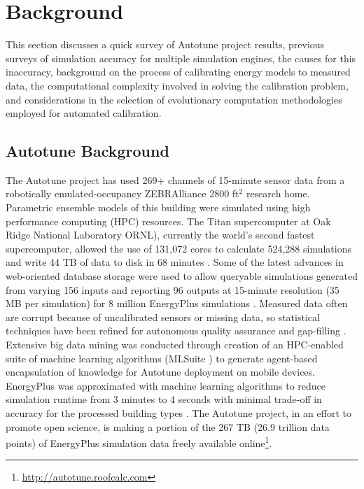 \documentclass[preprint, review, 12pt]{elsarticle}
\begin{document}
\section{Background}
\label{sec:background}
This section discusses a quick survey of Autotune project results, previous surveys of simulation accuracy for multiple simulation engines, the causes for this inaccuracy, background on the process of calibrating energy models to measured data, the computational complexity involved in solving the calibration problem, and considerations in the selection of evolutionary computation methodologies employed for automated calibration.

\subsection{Autotune Background}
The Autotune project has used 269+ channels of 15-minute sensor data from a robotically emulated-occupancy ZEBRAlliance \cite{cit:miller2012,cit:biswas2012} 2800 ft$^2$ research home. Parametric ensemble models of this building were simulated using high performance computing (HPC) resources. The Titan supercomputer at Oak Ridge National Laboratory ORNL), currently the world’s second fastest supercomputer, allowed the use of 131,072 cores to calculate 524,288 simulations and write 44 TB of data to disk in 68 minutes \cite{cit:sanyal2013a}. Some of the latest advances in web-oriented database storage were used to allow queryable simulations generated from varying 156 inputs and reporting 96 outputs at 15-minute resolution (35 MB per simulation) for 8 million EnergyPlus simulations \cite{cit:sanyal2013b}. Measured data often are corrupt because of  uncalibrated sensors or missing data, so statistical techniques have been refined for autonomous quality assurance and gap-filling \cite{cit:castello2012}. Extensive big data mining was conducted through creation of an HPC-enabled suite of machine learning algorithms (MLSuite \cite{cit:edwards2013}) to generate agent-based encapsulation of knowledge for Autotune deployment on mobile devices. EnergyPlus was approximated with machine learning algorithms to reduce simulation runtime from 3 minutes to 4 seconds with minimal trade-off in accuracy for the processed building types \cite{cit:edwards2013}. The Autotune project, in an effort to promote open science, is making a portion of the 267 TB (26.9 trillion data points) of EnergyPlus simulation data freely available online\footnote{\url{http://autotune.roofcalc.com}}.
\end{document}
